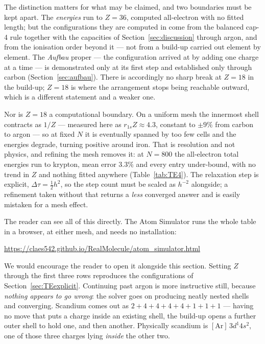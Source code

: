 \documentclass[11pt]{article}
\begin{document}
The distinction matters for what may be claimed, and two boundaries must be kept apart. The
\emph{energies} run to $Z=36$, computed all-electron with no
fitted length; but the configurations they are computed in come from the balanced cap-4 rule
together with the capacities of Section~\ref{sec:discussion} through argon, and from the ionisation
order beyond it --- not from a build-up carried out element by element. The \emph{Aufbau} proper --- the configuration arrived at by adding one
charge at a time --- is demonstrated only at its first step and established only through carbon
(Section~\ref{sec:aufbau}). There is accordingly no sharp break at $Z=18$ in the build-up;
$Z=18$ is where the arrangement stops being reachable outward, which is a different statement
and a weaker one.

Nor is $Z=18$ a computational boundary. On a uniform mesh the innermost shell contracts as
$1/Z$ --- measured here as $r_{1s}Z \approx 4.3$, constant to $\pm9\%$ from carbon to argon ---
so at fixed $N$ it is eventually spanned by too few cells and the energies degrade, turning
positive around iron. That is resolution and not physics, and refining the mesh removes it: at
$N=800$ the all-electron total energies run to krypton, mean error $3.3\%$ and every entry
under-bound, with no trend in $Z$ and nothing fitted anywhere (Table~\ref{tab:TE4}). The relaxation step is explicit, $\Delta\tau=\tfrac12
h^2$, so the step count must be scaled as $h^{-2}$ alongside; a refinement taken without that
returns a \emph{less} converged answer and is easily mistaken for a mesh effect.

The reader can see all of this directly. The Atom Simulator runs the whole table in a browser,
at either mesh, and needs no installation:
\begin{center}
\url{https://claes542.github.io/RealMolecule/atom_simulator.html}
\end{center}
We would encourage the reader to open it alongside this section. Setting $Z$ through the first
three rows reproduces the configurations of Section~\ref{sec:TEexplicit}. Continuing past argon
is more instructive still, because \emph{nothing appears to go wrong}: the solver goes on
producing neatly nested shells and converging. Scandium comes out as
$2{+}4{+}4{+}4{+}4{+}1{+}1{+}1$ --- having no move that puts a charge inside an existing shell,
the build-up opens a further outer shell to hold one, and then another. Physically scandium is
$[\mathrm{Ar}]\,3d^1 4s^2$, one of those three charges lying \emph{inside} the other two.
\end{document}
